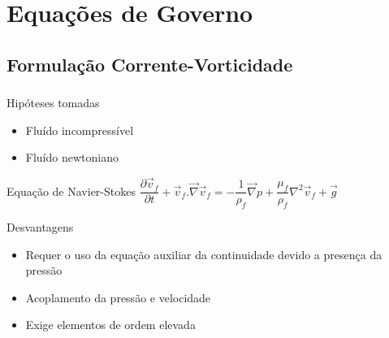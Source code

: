 \documentclass{beamer}
\begin{document}
\section{Equações de Governo}

\subsection{Formulação Corrente-Vorticidade}
\begin{frame}
  \frametitle{\subsecname}
  
  \begin{block}{Hipóteses tomadas}
    \begin{itemize}
     \item Fluído incompressível
     \item Fluído newtoniano
    \end{itemize}
  \end{block}
  
  \begin{block}{Equação de Navier-Stokes}
    \centering
    $\dfrac{\partial \vec{v}_f}{\partial t} + \vec{v}_f.\vec{\nabla}\vec{v}_f =
    -\dfrac{1}{\rho_f} \vec{\nabla}p + \dfrac{\mu_f}{\rho_f} \nabla^2\vec{v}_f + \vec{g}$
  \end{block}
  
  \begin{block}{Desvantagens}
    \begin{itemize}
     \item Requer o uso da equação auxiliar da continuidade devido a presença da pressão
     \item Acoplamento da pressão e velocidade
     \item Exige elementos de ordem elevada
    \end{itemize}
  \end{block}
\end{frame}
\end{document}
